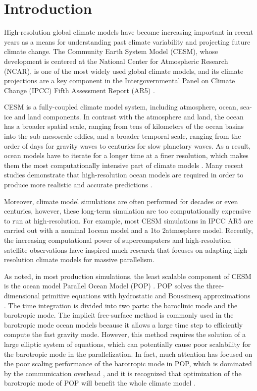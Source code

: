 \section{Introduction} \label{se:int}
High-resolution global climate models have become increasing important
in recent years as a means for
understanding past climate variability and projecting future climate
change.  The Community Earth System Model (CESM),
whose development is centered at the National Center for Atmospheric
Research (NCAR), is one of the most widely used global climate models,
and its climate projections are a key component in the Intergovernmental
Panel on Climate Change (IPCC) Fifth Assessment Report (AR5)
\cite{stocker2013ipcc}.

CESM is a fully-coupled climate model system, including
atmosphere, ocean, sea-ice and land components.  In contrast with the
atmosphere and land, the ocean has a broader spatial scale, ranging
from tens of kilometers of the ocean basins into the sub-mesoscale
eddies, and a broader temporal scale, ranging from the order of days
for gravity waves to centuries for slow planetary waves.  As a result,
ocean models have to iterate for a longer time at a finer resolution,
which makes them the most computationally intensive part of climate
models \cite{Worley:2011:PCE:2063384.2063457,dennis2012computational}.
Many recent studies demonstrate that high-resolution ocean models are
required in order to produce more realistic and accurate predictions
\cite{bryan2010frontal,mcclean2011prototype,graham2014importance}.
 

Moreover, climate model simulations are often performed for decades or
even centuries, however, these long-term simulation are too
computationally expensive to run at high-resolution.  For example,
most CESM simulations in IPCC AR5 are carried out with a nominal
1\degree ocean model and a 1\degree to 2\degree atmosphere model.
Recently, the increasing computational power of supercomputers and
high-resolution satellite observations have inspired much research
that focuses on adapting high-resolution climate models for massive
parallelism.

As noted, in most production simulations, the least scalable 
component of CESM is the ocean model Parallel Ocean Model (POP)
\cite{dennis2012computational}.  POP solves the three-dimensional
primitive equations with hydrostatic and Boussinesq approximations
\cite{smith2010parallel}.  The time integration is divided into two
parts: the baroclinic mode and the barotropic mode.  The implicit
free-surface method is commonly used in the barotropic mode ocean
models because it allows a large time step to efficiently compute the
fast gravity mode.  However, this method requires the solution of a
large elliptic system of equations, which can potentially cause poor
scalability for the barotropic mode in the parallelization.  In fact,
much attention has focused on the poor scaling performance of the
barotropic mode in POP,  which is dominated by
the communication overhead \cite{Worley:2011:PCE:2063384.2063457}, and
it is recognized that
optimization of the barotropic mode of POP will benefit the whole
climate model  \cite{dennis2012computational} .


